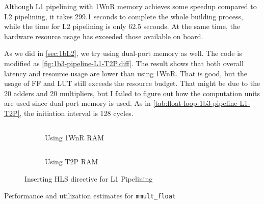 Although L1 pipelining with 1WnR memory achieves some speedup compared to L2 pipelining, it takes 299.1 seconds to complete the whole building process, while the time for L2 pipelining is only 62.5 seconds.
At the same time, the hardware resource usage has exceeded those available on board.

As we did in \autoref{sec:1bL2}, we try using dual-port memory as well.
The code is modified as \autoref{fig:1b3-pipeline-L1-T2P.diff}.
The result shows that both overall latency and resource usage are lower than using 1WnR.
That is good, but the usage of FF and LUT still exceeds the resource budget.
That might be due to the 20 adders and 20 multipliers, but I failed to figure out how the computation units are used since dual-port memory is used.
As in \autoref{tab:float-loop-1b3-pipeline-L1-T2P}, the initiation interval is 128 cycles.


\begin{figure}[ht!]

    \begin{subfigure}{\textwidth}
        \centering
        \inputminted[firstline=3]{diff}{program/1b3-pipeline-L1-1WnR.diff}
        \caption{Using 1WnR RAM}
        \label{fig:1b3-pipeline-L1-1WnR.diff}
    \end{subfigure}

    \begin{subfigure}{\textwidth}
        \centering
        \inputminted[firstline=3]{diff}{program/1b3-pipeline-L1-T2P.diff}
        \caption{Using T2P RAM}
        \label{fig:1b3-pipeline-L1-T2P.diff}
    \end{subfigure}

    \caption{Inserting HLS directive for L1 Pipelining}

\end{figure}


\begin{table}
    \caption{Performance and utilization estimates for \texttt{mmult\_float}}\label{tab:float-summary}
    
\end{table}

